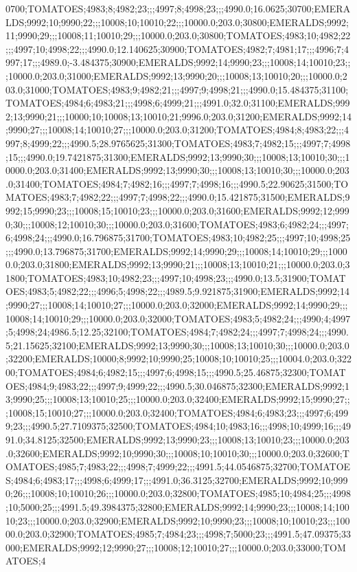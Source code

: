 0700;TOMATOES;4983;8;4982;23;;;4997;8;4998;23;;;4990.0;16.0625;30700;EMERALDS;9992;10;9990;22;;;10008;10;10010;22;;;10000.0;203.0;30800;EMERALDS;9992;11;9990;29;;;10008;11;10010;29;;;10000.0;203.0;30800;TOMATOES;4983;10;4982;22;;;4997;10;4998;22;;;4990.0;12.140625;30900;TOMATOES;4982;7;4981;17;;;4996;7;4997;17;;;4989.0;-3.484375;30900;EMERALDS;9992;14;9990;23;;;10008;14;10010;23;;;10000.0;203.0;31000;EMERALDS;9992;13;9990;20;;;10008;13;10010;20;;;10000.0;203.0;31000;TOMATOES;4983;9;4982;21;;;4997;9;4998;21;;;4990.0;15.484375;31100;TOMATOES;4984;6;4983;21;;;4998;6;4999;21;;;4991.0;32.0;31100;EMERALDS;9992;13;9990;21;;;10000;10;10008;13;10010;21;9996.0;203.0;31200;EMERALDS;9992;14;9990;27;;;10008;14;10010;27;;;10000.0;203.0;31200;TOMATOES;4984;8;4983;22;;;4997;8;4999;22;;;4990.5;28.9765625;31300;TOMATOES;4983;7;4982;15;;;4997;7;4998;15;;;4990.0;19.7421875;31300;EMERALDS;9992;13;9990;30;;;10008;13;10010;30;;;10000.0;203.0;31400;EMERALDS;9992;13;9990;30;;;10008;13;10010;30;;;10000.0;203.0;31400;TOMATOES;4984;7;4982;16;;;4997;7;4998;16;;;4990.5;22.90625;31500;TOMATOES;4983;7;4982;22;;;4997;7;4998;22;;;4990.0;15.421875;31500;EMERALDS;9992;15;9990;23;;;10008;15;10010;23;;;10000.0;203.0;31600;EMERALDS;9992;12;9990;30;;;10008;12;10010;30;;;10000.0;203.0;31600;TOMATOES;4983;6;4982;24;;;4997;6;4998;24;;;4990.0;16.796875;31700;TOMATOES;4983;10;4982;25;;;4997;10;4998;25;;;4990.0;13.796875;31700;EMERALDS;9992;14;9990;29;;;10008;14;10010;29;;;10000.0;203.0;31800;EMERALDS;9992;13;9990;21;;;10008;13;10010;21;;;10000.0;203.0;31800;TOMATOES;4983;10;4982;23;;;4997;10;4998;23;;;4990.0;13.5;31900;TOMATOES;4983;5;4982;22;;;4996;5;4998;22;;;4989.5;9.921875;31900;EMERALDS;9992;14;9990;27;;;10008;14;10010;27;;;10000.0;203.0;32000;EMERALDS;9992;14;9990;29;;;10008;14;10010;29;;;10000.0;203.0;32000;TOMATOES;4983;5;4982;24;;;4990;4;4997;5;4998;24;4986.5;12.25;32100;TOMATOES;4984;7;4982;24;;;4997;7;4998;24;;;4990.5;21.15625;32100;EMERALDS;9992;13;9990;30;;;10008;13;10010;30;;;10000.0;203.0;32200;EMERALDS;10000;8;9992;10;9990;25;10008;10;10010;25;;;10004.0;203.0;32200;TOMATOES;4984;6;4982;15;;;4997;6;4998;15;;;4990.5;25.46875;32300;TOMATOES;4984;9;4983;22;;;4997;9;4999;22;;;4990.5;30.046875;32300;EMERALDS;9992;13;9990;25;;;10008;13;10010;25;;;10000.0;203.0;32400;EMERALDS;9992;15;9990;27;;;10008;15;10010;27;;;10000.0;203.0;32400;TOMATOES;4984;6;4983;23;;;4997;6;4999;23;;;4990.5;27.7109375;32500;TOMATOES;4984;10;4983;16;;;4998;10;4999;16;;;4991.0;34.8125;32500;EMERALDS;9992;13;9990;23;;;10008;13;10010;23;;;10000.0;203.0;32600;EMERALDS;9992;10;9990;30;;;10008;10;10010;30;;;10000.0;203.0;32600;TOMATOES;4985;7;4983;22;;;4998;7;4999;22;;;4991.5;44.0546875;32700;TOMATOES;4984;6;4983;17;;;4998;6;4999;17;;;4991.0;36.3125;32700;EMERALDS;9992;10;9990;26;;;10008;10;10010;26;;;10000.0;203.0;32800;TOMATOES;4985;10;4984;25;;;4998;10;5000;25;;;4991.5;49.3984375;32800;EMERALDS;9992;14;9990;23;;;10008;14;10010;23;;;10000.0;203.0;32900;EMERALDS;9992;10;9990;23;;;10008;10;10010;23;;;10000.0;203.0;32900;TOMATOES;4985;7;4984;23;;;4998;7;5000;23;;;4991.5;47.09375;33000;EMERALDS;9992;12;9990;27;;;10008;12;10010;27;;;10000.0;203.0;33000;TOMATOES;4